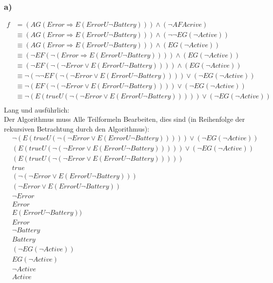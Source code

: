 \subsubsection*{a)}
\begin{align*}
f&= \left(AG(Error \Rightarrow E(Error U \neg Battery))\right) \wedge \left( \neg AF Acrive\right)\\
&\equiv \left(AG(Error \Rightarrow E(Error U \neg Battery))\right) \wedge \left( \neg \neg EG( \neg Active)\right)\\
&\equiv \left(AG(Error \Rightarrow E(Error U \neg Battery))\right) \wedge \left( EG( \neg Active)\right)\\
&\equiv \left(\neg EF (\neg(Error \Rightarrow E(Error U \neg Battery)))\right) \wedge \left( EG( \neg Active)\right)\\
&\equiv \left(\neg EF (\neg(\neg Error \vee E(Error U \neg Battery)))\right) \wedge \left( EG( \neg Active)\right)\\
&\equiv \neg\left(\neg \neg EF (\neg(\neg Error \vee E(Error U \neg Battery)))\right) \vee \left(\neg EG( \neg Active)\right)\\
&\equiv \neg\left(EF (\neg(\neg Error \vee E(Error U \neg Battery)))\right) \vee \left(\neg EG( \neg Active)\right)\\
&\equiv \neg\left(E (trueU (\neg(\neg Error \vee E(Error U \neg Battery))))\right) \vee \left(\neg EG( \neg Active)\right)\\
\end{align*}
Lang und ausführlich:\\
Der Algorithmus muss Alle Teilformeln Bearbeiten, dies sind (in Reihenfolge der rekursiven Betrachtung durch den Algorithmus):
\begin{align}
&\neg\left(E (trueU (\neg(\neg Error \vee E(Error U \neg Battery))))\right) \vee \left(\neg EG( \neg Active)\right)\\
&\left(E (trueU (\neg(\neg Error \vee E(Error U \neg Battery))))\right) \vee \left(\neg EG( \neg Active)\right)\\
&\left(E (trueU (\neg(\neg Error \vee E(Error U \neg Battery))))\right)\\
& true\\
& (\neg(\neg Error \vee E(Error U \neg Battery)))\\
& (\neg Error \vee E(Error U \neg Battery))\\
& \neg Error\\
& Error\\
& E(Error U \neg Battery))\\
& Error \\
& \neg Battery\\
& Battery\\
& \left(\neg EG( \neg Active)\right)\\
& EG( \neg Active)\\
& \neg Active\\
& Active
\end{align}


